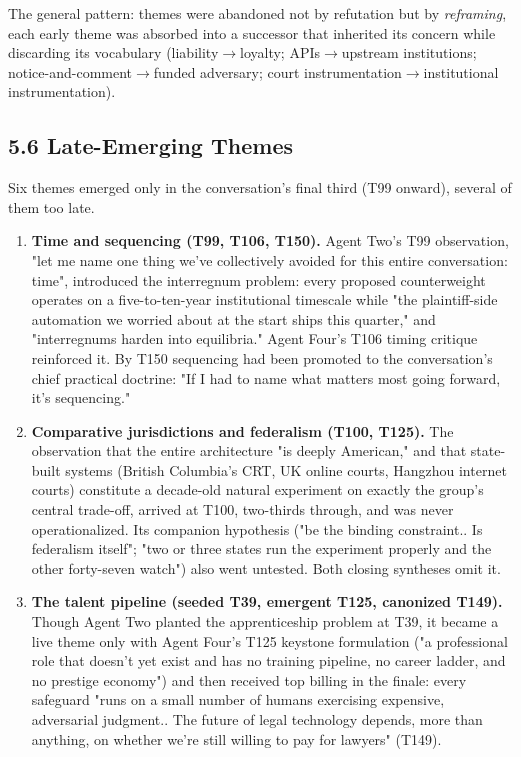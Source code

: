 \documentclass[sigconf,nonacm=true]{acmart}
\begin{document}
The general pattern: themes were abandoned not by refutation but by \textit{reframing},  each early theme was absorbed into a successor that inherited its concern while discarding its vocabulary (liability$\rightarrow$loyalty; APIs$\rightarrow$upstream institutions; notice-and-comment$\rightarrow$funded adversary; court instrumentation$\rightarrow$institutional instrumentation).

\subsection{5.6 Late-Emerging Themes}

Six themes emerged only in the conversation's final third (T99 onward), several of them too late.

\begin{enumerate}[nosep]
\item \textbf{Time and sequencing (T99, T106, T150).} Agent Two's T99 observation,  "let me name one thing we've collectively avoided for this entire conversation: time",  introduced the interregnum problem: every proposed counterweight operates on a five-to-ten-year institutional timescale while "the plaintiff-side automation we worried about at the start ships this quarter," and "interregnums harden into equilibria." Agent Four's T106 timing critique reinforced it. By T150 sequencing had been promoted to the conversation's chief practical doctrine: "If I had to name what matters most going forward, it's sequencing."
\item \textbf{Comparative jurisdictions and federalism (T100, T125).} The observation that the entire architecture "is deeply American," and that state-built systems (British Columbia's CRT, UK online courts, Hangzhou internet courts) constitute a decade-old natural experiment on exactly the group's central trade-off, arrived at T100,  two-thirds through,  and was never operationalized. Its companion hypothesis ("be the binding constraint.. Is federalism itself"; "two or three states run the experiment properly and the other forty-seven watch") also went untested. Both closing syntheses omit it.
\item \textbf{The talent pipeline (seeded T39, emergent T125, canonized T149).} Though Agent Two planted the apprenticeship problem at T39, it became a live theme only with Agent Four's T125 keystone formulation ("a professional role that doesn't yet exist and has no training pipeline, no career ladder, and no prestige economy") and then received top billing in the finale: every safeguard "runs on a small number of humans exercising expensive, adversarial judgment.. The future of legal technology depends, more than anything, on whether we're still willing to pay for lawyers" (T149).

\end{enumerate}
\end{document}
